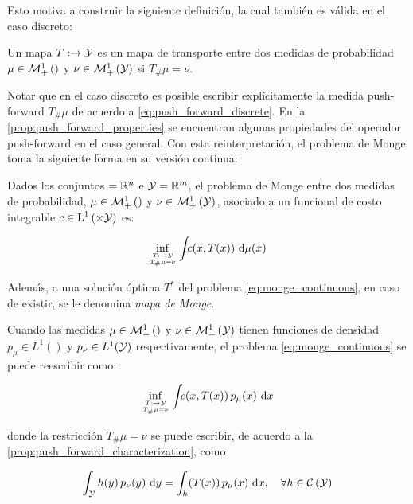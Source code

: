 Esto motiva a construir la siguiente definición, la cual también es válida en el caso discreto:

\begin{defn}
	Un mapa $T:\to\mathcal{Y}$ es un mapa de transporte entre dos medidas de probabilidad $\mu\in\mathcal{M}_+^1\left(\right)$ y $\nu\in\mathcal{M}_+^1\left(\mathcal{Y}\right)$ si $T_\#\mu = \nu$.
\end{defn}

Notar que en el caso discreto es posible escribir explícitamente la medida push-forward $T_\#\mu$ de acuerdo a \eqref{eq:push_forward_discrete}. En la \autoref{prop:push_forward_properties} se encuentran algunas propiedades del operador push-forward en el caso general. Con esta reinterpretación, el problema de Monge toma la siguiente forma en su versión continua:

\begin{defn}
	Dados los conjuntos $=\mathbb{R}^n$ e $\mathcal{Y}=\mathbb{R}^m$, el problema de Monge entre dos medidas de probabilidad, $\mu\in\mathcal{M}_+^1\left(\right)$ y $\nu\in\mathcal{M}_+^1\left(\mathcal{Y}\right)$, asociado a un funcional de costo integrable $c\in\lspace{1}{\xspace\times\yspace}$ es:

	\begin{equation}
		\label{eq:monge_continuous}
		\inf_{\feasible{T:\xspace\to\yspace}{T_\#\mu=\nu}}
		\int_{\xspace} c(x, T(x)) \d\mu(x)
	\end{equation}

	Además, a una solución óptima $T^*$ del problema \eqref{eq:monge_continuous}, en caso de existir, se le denomina \textit{mapa de Monge}.
\end{defn}

Cuando las medidas $\mu\in\mathcal{M}_+^1\left(\right)$ y $\nu\in\mathcal{M}_+^1\left(\mathcal{Y}\right)$ tienen funciones de densidad $p_\mu\in L^1(\xspace)$ y $p_\nu\in L^1(\mathcal{Y})$ respectivamente, el problema \eqref{eq:monge_continuous} se puede reescribir como:

\begin{equation*}
	\inf_{\feasible{T:\xspace\to\yspace}{T_\#\mu=\nu}}
	\int_{\xspace} c(x, T(x))\, p_\mu(x)\d x
\end{equation*}

donde la restricción $T_\#\mu=\nu$ se puede escribir, de acuerdo a la \autoref{prop:push_forward_characterization}, como

\begin{equation*}
	\int_{\mathcal{Y}} h(y)\, p_\nu(y) \,\operatorname{d}\! y = \int_ h(T(x))\, p_\mu(x) \,\operatorname{d}\! x,
	\quad\forall h\in \mathcal{C}\left(\mathcal{Y}\right)
\end{equation*}

